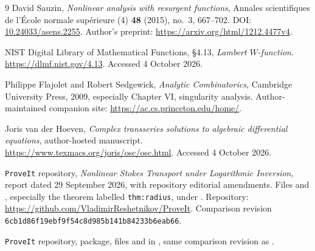 \documentclass[11pt,a4paper]{article}
\numberwithin{equation}{section}
\theoremstyle{definition}
\theoremstyle{remark}
\newcommand{\repo}{\texttt{ProveIt}}
\begin{document}
\clearpage
{}
{}
\begin{thebibliography}{9}
David Sauzin, \emph{Nonlinear analysis with resurgent functions},
Annales scientifiques de l'\'Ecole normale sup\'erieure (4) \textbf{48} (2015), no.~3, 667--702.
DOI: \href{https://doi.org/10.24033/asens.2255}{10.24033/asens.2255}.
Author's preprint: \url{https://arxiv.org/html/1212.4477v4}.

NIST Digital Library of Mathematical Functions, \S4.13, \emph{Lambert $W$-function}.
\url{https://dlmf.nist.gov/4.13}. Accessed 4 October 2026.

Philippe Flajolet and Robert Sedgewick, \emph{Analytic Combinatorics},
Cambridge University Press, 2009, especially Chapter VI, singularity analysis.
Author-maintained companion site: \url{https://ac.cs.princeton.edu/home/}.

Joris van der Hoeven, \emph{Complex transseries solutions to algebraic differential equations}, author-hosted manuscript.
\url{https://www.texmacs.org/joris/osc/osc.html}. Accessed 4 October 2026.

\repo{} repository, \emph{Nonlinear Stokes Transport under Logarithmic Inversion},
report dated 29 September 2026, with repository editorial amendments.
Files  and , especially the theorem labelled \texttt{thm:radius}, under
.
Repository: \url{https://github.com/VladimirReshetnikov/ProveIt}.
Comparison revision \texttt{6cb1d86f19ebf9f54c8d985b141b84233b6eab66}.

\repo{} repository,  package,
files  and  in
, same comparison revision as \cite{repo-stokes}.

\end{thebibliography}
\end{document}
